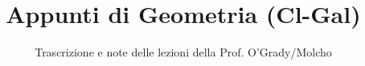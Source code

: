 \documentclass[a4paper,12pt]{article}
\title{Appunti di Geometria (Cl-Gal)}
\author{Trascrizione e note delle lezioni della Prof. O'Grady/Molcho}
\date{}
\begin{document}
\maketitle
\projectintro
\tableofcontents
\newpage

\end{document}
